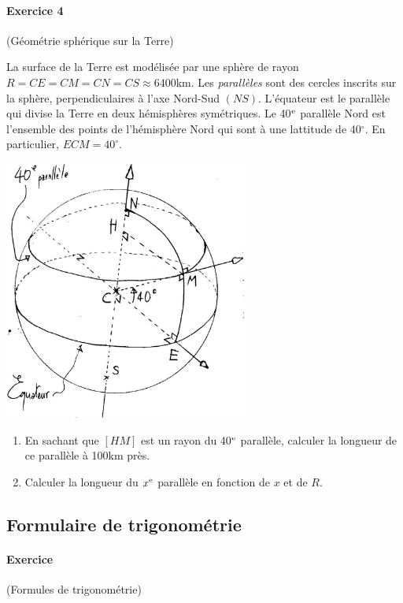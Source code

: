 		\paragraph{Exercice 4} (Géométrie sphérique sur la Terre)

			La surface de la Terre est modélisée par une sphère de rayon $R=CE=CM=CN=CS\approx 6400$km. Les \emph{parallèles} sont des cercles inscrits sur la sphère, perpendiculaires à l'axe Nord-Sud $(NS)$. L'équateur est le parallèle qui divise la Terre en deux hémisphères symétriques. Le 40$^{\mathrm{e}}$ parallèle Nord est l'ensemble des points de l'hémisphère Nord qui sont à une lattitude de 40$^\circ$. En particulier, $ECM=40^\circ$.
			
			\vspace{0.4cm}

			\includegraphics[width=0.6\textwidth]{image/fct_trigo/exo_trigo_sphere.jpg}
			
			\begin{enumerate}[1)]
				\item En sachant que $[HM]$ est un rayon du 40$^{\mathrm{e}}$ parallèle, calculer la longueur de ce parallèle à 100km près.
				\item Calculer la longueur du $x^{\mathrm{e}}$ parallèle en fonction de $x$ et de $R$. 
			\end{enumerate}


	\subsection{Formulaire de trigonométrie}
		\paragraph{Exercice } (Formules de trigonométrie)

